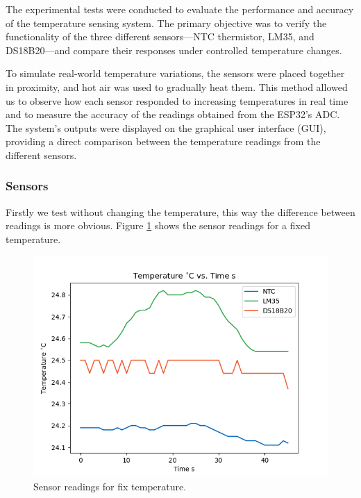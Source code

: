 \documentclass[12pt]{article}
\begin{document}
    The experimental tests were conducted to evaluate the performance and accuracy of the temperature sensing system. The primary objective was to verify the functionality of the three different sensors—NTC thermistor, LM35, and DS18B20—and compare their responses under controlled temperature changes.

    To simulate real-world temperature variations, the sensors were placed together in proximity, and hot air was used to gradually heat them. This method allowed us to observe how each sensor responded to increasing temperatures in real time and to measure the accuracy of the readings obtained from the ESP32's ADC. The system's outputs were displayed on the graphical user interface (GUI), providing a direct comparison between the temperature readings from the different sensors.

        
    \subsubsection{ Sensors}

        Firstly we test without changing the temperature, this way the difference between readings is more obvious. Figure \ref{fig:FixTemp} shows the sensor readings for a fixed temperature. 
        
        \begin{figure}[H] 
            \centering
            \includegraphics*[scale = 0.5]{images/TempFixTest.png}
            \caption{Sensor readings for fix temperature.}
            \label{fig:FixTemp}
        \end{figure}
        
\end{document}
